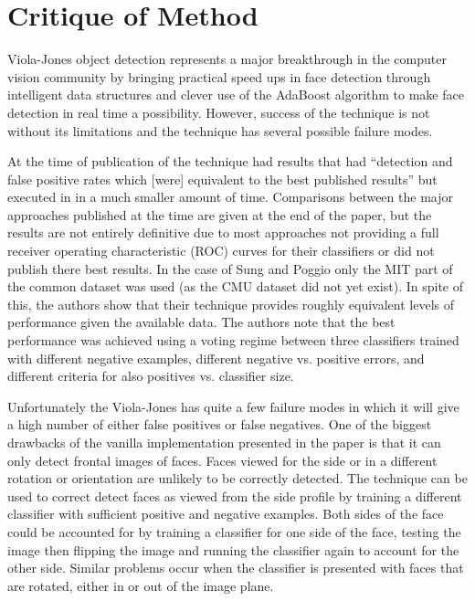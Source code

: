 \documentclass[conference]{IEEEtran}
\begin{document}
\section{Critique of Method} \label{sec:critique-of-method}
Viola-Jones object detection represents a major breakthrough in the computer vision community by bringing practical speed ups in face detection through intelligent data structures and clever use of the AdaBoost algorithm to make face detection in real time a possibility. However, success of the technique is not without its limitations and the technique has several possible failure modes.

At the time of publication of the technique had results that had ``detection and false positive rates which [were] equivalent to the best published results'' \cite{viola2004robust} but executed in in a much smaller amount of time. Comparisons between the major approaches published at the time are given at the end of the paper, but the results are not entirely definitive due to most approaches not providing a full receiver operating characteristic (ROC) curves for their classifiers or did not publish there best results. In the case of Sung and Poggio \cite{sung1998example} only the MIT part of the common dataset was used (as the CMU dataset did not yet exist). In spite of this, the authors show that their technique provides roughly equivalent levels of performance given the available data. The authors note that the best performance was achieved using a voting regime between three classifiers trained with different negative examples, different negative vs. positive errors, and different criteria for also positives vs. classifier size.

Unfortunately the Viola-Jones has quite a few failure modes in which it will give a high number of either false positives or false negatives. One of the biggest drawbacks of the vanilla implementation presented in the paper is that it can only detect frontal images of faces. Faces viewed for the side or in a different rotation or orientation are unlikely to be correctly detected. The technique can be used to correct detect faces as viewed from the side profile by training a different classifier with sufficient positive and negative examples. Both sides of the face could be accounted for by training a classifier for one side of the face, testing the image then flipping the image and running the classifier again to account for the other side. Similar problems occur when the classifier is presented with faces that are rotated, either in or out of the image plane. 
\end{document}
